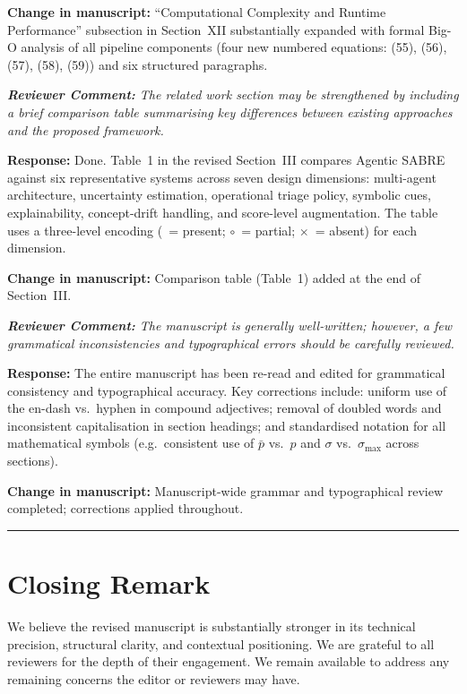 \documentclass[11pt,a4paper]{article}
\newcommand{\RC}[1]{\begin{reviewbox}\textit{\textbf{Reviewer Comment:} #1}\end{reviewbox}}
\newcommand{\RS}[1]{\noindent\textcolor{responsegreen}{\textbf{Response:}} #1\par\medskip}
\newcommand{\CH}[1]{\noindent\textcolor{changebrown}{\textbf{Change in manuscript:}} #1\par\bigskip}
\begin{document}
\CH{``Computational Complexity and Runtime Performance'' subsection in
Section~XII substantially expanded with formal Big-O analysis of all pipeline
components (four new numbered equations: (55),
(56), (57), (58),
(59)) and six structured paragraphs.}

\RC{The related work section may be strengthened by including a brief comparison
table summarising key differences between existing approaches and the proposed
framework.}

\RS{Done. Table~1 in the revised Section~III compares Agentic SABRE against six
representative systems across seven design dimensions: multi-agent architecture,
uncertainty estimation, operational triage policy, symbolic cues, explainability,
concept-drift handling, and score-level augmentation. The table uses a three-level
encoding (\checkmark~= present; $\circ$~= partial; $\times$~= absent) for each
dimension.}

\CH{Comparison table (Table~1) added at the end of Section~III.}

\RC{The manuscript is generally well-written; however, a few grammatical
inconsistencies and typographical errors should be carefully reviewed.}

\RS{The entire manuscript has been re-read and edited for grammatical consistency
and typographical accuracy. Key corrections include: uniform use of the en-dash
vs.\ hyphen in compound adjectives; removal of doubled words and inconsistent
capitalisation in section headings; and standardised notation for all mathematical
symbols (e.g.\ consistent use of $\bar{p}$ vs.\ $\hat{p}$ and $\sigma$ vs.\
$\sigma_{\max}$ across sections).}

\CH{Manuscript-wide grammar and typographical review completed; corrections
applied throughout.}

\bigskip
\hrule
\bigskip

\section*{Closing Remark}

We believe the revised manuscript is substantially stronger in its technical
precision, structural clarity, and contextual positioning. We are grateful to all
reviewers for the depth of their engagement. We remain available to address any
remaining concerns the editor or reviewers may have.
\end{document}
